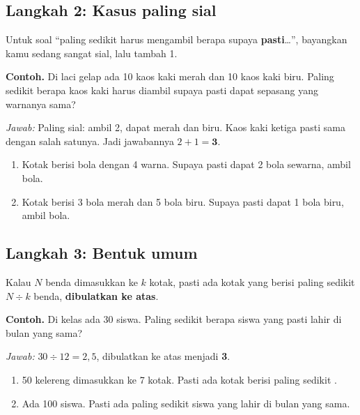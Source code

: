 \documentclass[11pt,a4paper]{article}
\begin{document}
\subsection*{Langkah 2: Kasus paling sial}
Untuk soal ``paling sedikit harus mengambil berapa supaya \textbf{pasti}\dots'', bayangkan kamu
sedang sangat sial, lalu tambah 1.

\begin{contoh}
\textbf{Contoh.} Di laci gelap ada 10 kaos kaki merah dan 10 kaos kaki biru. Paling sedikit
berapa kaos kaki harus diambil supaya pasti dapat sepasang yang warnanya sama?

\textit{Jawab:} Paling sial: ambil 2, dapat merah dan biru. Kaos kaki ketiga pasti sama dengan
salah satunya. Jadi jawabannya $2 + 1 = \textbf{3}$.
\end{contoh}

\begin{giliranmu}
\begin{enumerate}[label=\alph*.]
    \item Kotak berisi bola dengan 4 warna. Supaya pasti dapat 2 bola sewarna, ambil \kosong{} bola.
    \item Kotak berisi 3 bola merah dan 5 bola biru. Supaya pasti dapat 1 bola biru, ambil
          \kosong{} bola.
\end{enumerate}
\end{giliranmu}

\subsection*{Langkah 3: Bentuk umum}
Kalau $N$ benda dimasukkan ke $k$ kotak, pasti ada kotak yang berisi paling sedikit
$N \div k$ benda, \textbf{dibulatkan ke atas}.

\begin{contoh}
\textbf{Contoh.} Di kelas ada 30 siswa. Paling sedikit berapa siswa yang pasti lahir di bulan
yang sama?

\textit{Jawab:} $30 \div 12 = 2{,}5$, dibulatkan ke atas menjadi \textbf{3}.
\end{contoh}

\begin{giliranmu}
\begin{enumerate}[label=\alph*.]
    \item 50 kelereng dimasukkan ke 7 kotak. Pasti ada kotak berisi paling sedikit \kosong.
    \item Ada 100 siswa. Pasti ada paling sedikit \kosong{} siswa yang lahir di bulan yang sama.
\end{enumerate}
\end{giliranmu}
\end{document}
